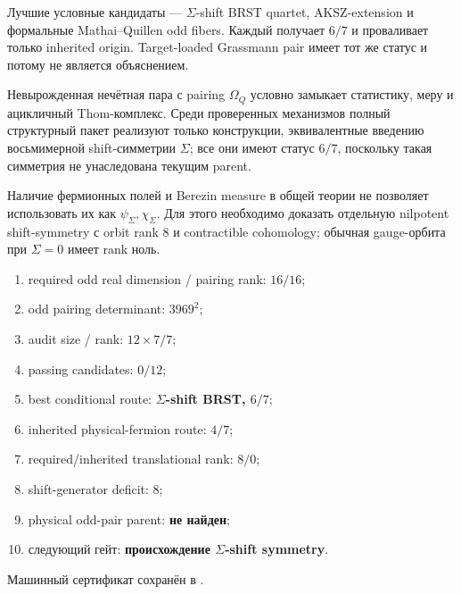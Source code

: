 Лучшие условные кандидаты --- $\Sigma$-shift BRST quartet, AKSZ-extension
и формальные Mathai--Quillen odd fibers. Каждый получает $6/7$ и
проваливает только inherited origin. Target-loaded Grassmann pair имеет тот
же статус и потому не является объяснением.

\begin{theorem}
Невырожденная нечётная пара с pairing $\Omega_Q$ условно замыкает
статистику, меру и ацикличный Thom-комплекс. Среди проверенных механизмов
полный структурный пакет реализуют только конструкции, эквивалентные
введению восьмимерной shift-симметрии $\Sigma$; все они имеют статус $6/7$,
поскольку такая симметрия не унаследована текущим parent.
\end{theorem}

\begin{nogocriterion}
Наличие фермионных полей и Berezin measure в общей теории не позволяет
использовать их как $\psi_\Sigma,\chi_\Sigma$. Для этого необходимо
доказать отдельную nilpotent shift-symmetry с orbit rank $8$ и
contractible cohomology; обычная gauge-орбита при $\Sigma=0$ имеет rank
ноль.
\end{nogocriterion}

\begin{protocol}\begin{enumerate}
\item required odd real dimension / pairing rank: \textbf{$16/16$};
\item odd pairing determinant: \textbf{$3969^2$};
\item audit size / rank: \textbf{$12\times7/7$};
\item passing candidates: \textbf{$0/12$};
\item best conditional route: \textbf{$\Sigma$-shift BRST, $6/7$};
\item inherited physical-fermion route: \textbf{$4/7$};
\item required/inherited translational rank: \textbf{$8/0$};
\item shift-generator deficit: \textbf{$8$};
\item physical odd-pair parent: \textbf{не найден};
\item следующий гейт: \textbf{происхождение $\Sigma$-shift symmetry}.
\end{enumerate}\end{protocol}

Машинный сертификат сохранён в
.